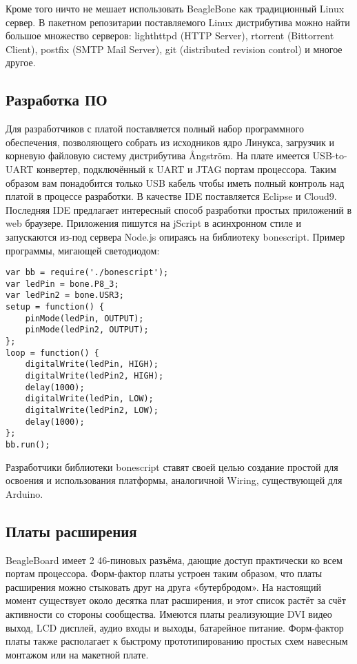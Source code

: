 \documentclass[10pt, a5paper]{article}
\begin{document}
Кроме того ничто не мешает использовать BeagleBone как традиционный Linux сервер. В пакетном репозитарии поставляемого Linux дистрибутива можно найти большое множество серверов: lighthttpd (HTTP Server), rtorrent (Bittorrent Client), postfix (SMTP Mail Server), git (distributed revision control) и многое другое.

\subsection*{Разработка ПО}

Для разработчиков с платой поставляется полный набор программного обеспечения, позволяющего собрать из исходников ядро Линукса, загрузчик и корневую файловую систему дистрибутива \AA{}ngstr\"{o}m. На плате имеется USB-to-UART конвертер, подключённый к UART и JTAG портам процессора. Таким образом вам понадобится только USB кабель чтобы иметь полный контроль над платой в процессе разработки.
В качестве IDE поставляется Eclipse и Cloud9. Последняя IDE предлагает интересный способ разработки простых приложений в web браузере. Приложения пишутся на jScript в асинхронном стиле и запускаются из-под сервера Node.js опираясь на библиотеку bonescript. Пример программы, мигающей светодиодом:

\begin{verbatim}
var bb = require('./bonescript');
var ledPin = bone.P8_3;
var ledPin2 = bone.USR3;
setup = function() {
    pinMode(ledPin, OUTPUT);
    pinMode(ledPin2, OUTPUT);
};
loop = function() {
    digitalWrite(ledPin, HIGH);
    digitalWrite(ledPin2, HIGH);
    delay(1000);
    digitalWrite(ledPin, LOW);
    digitalWrite(ledPin2, LOW);
    delay(1000);
};
bb.run();
\end{verbatim}

Разработчики библиотеки bonescript ставят своей целью создание простой для освоения и использования платформы, аналогичной Wiring, существующей для Arduino.

\subsection*{Платы расширения}

BeagleBoard имеет 2 46-пиновых разъёма, дающие доступ практически ко всем портам процессора. Форм-фактор платы устроен таким образом, что платы расширения можно стыковать друг на друга «бутербродом». На настоящий момент существует около десятка плат расширения, и этот список растёт за счёт активности со стороны сообщества. Имеются платы реализующие DVI видео выход, LCD дисплей, аудио входы и выходы, батарейное питание. Форм-фактор платы также располагает к быстрому прототипированию простых схем навесным монтажом или на макетной плате.
\end{document}
